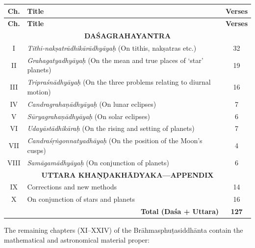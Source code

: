 \documentclass[11pt,a4paper]{article}
\begin{document}
\begin{longtable}{|c|p{8.5cm}|c|}
\hline
\textbf{Ch.} & \textbf{Title} & \textbf{Verses} \\
\hline
\endfirsthead
\hline
\textbf{Ch.} & \textbf{Title} & \textbf{Verses} \\
\hline
\endhead
\multicolumn{3}{|c|}{\textbf{DA\'SAGRAHAYANTRA}} \\
\hline
I & \textit{Tithi-nakṣatr\=adhik\=ar\=adhy\=ayaḥ} (On tithis, nakṣatras etc.) & 32 \\
II & \textit{Grahagatyadhy\=ayaḥ} (On the mean and true places of `star' planets) & 19 \\
III & \textit{Tripra\'sn\=adhy\=ayaḥ} (On the three problems relating to diurnal motion) & 16 \\
IV & \textit{Candragrahaṇ\=adhy\=ayaḥ} (On lunar eclipses) & 7 \\
V & \textit{S\=uryagrahaṇ\=adhy\=ayaḥ} (On solar eclipses) & 6 \\
VI & \textit{Uday\=ast\=adhik\=araḥ} (On the rising and setting of planets) & 7 \\
VII & \textit{Candra\'sṛṅgonnatyadh\=ayaḥ} (On the position of the Moon's cusps) & 4 \\
VIII & \textit{Sam\=agam\=adhy\=ayaḥ} (On conjunction of planets) & 6 \\
\hline
\multicolumn{3}{|c|}{\textbf{UTTARA KHA\d N\d DAKH\=ADYAKA---APPENDIX}} \\
\hline
IX & Corrections and new methods & 14 \\
X & On conjunction of stars and planets & 16 \\
\hline
\multicolumn{2}{|r|}{\textbf{Total (Da\'sa + Uttara)}} & \textbf{127} \\
\hline
\end{longtable}

The remaining chapters (XI--XXIV) of the Br\=ahmasphuṭasiddh\=anta contain the mathematical and astronomical material proper:
\end{document}
